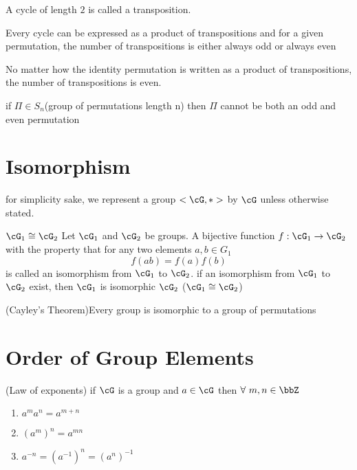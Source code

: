 \documentclass[11pt, oneside, dvipdfmx]{book}
\begin{document}
	\begin{description}
	\item A cycle of length $2$ is called a transposition.
	
	\item Every cycle can be expressed as a product of transpositions and for a given permutation, the number of transpositions is either always odd or always even
	\end{description}
	
	\begin{MyTheorem}
	No matter how the identity permutation is written as a product of transpositions, the number of transpositions is even.
	\end{MyTheorem}
	
	\begin{MyTheorem}
	if $\Pi \in S_n$(group of permutations length n)  then $\Pi$ cannot be both an odd and even permutation
	\end{MyTheorem}
	
	\section{Isomorphism}
	for simplicity sake, we represent a group $<\cG, *>$ by $\cG$ unless otherwise stated.
	\begin{MyDefinition}{$\cG_1\cong \cG_2$}
	Let $\cG_1$ and $\cG_2$ be groups. A bijective function $f: \cG_1 \rightarrow \cG_2$ with the property that for any two elements $a,b \in G_1$
	$$f(ab) =f(a)f(b)$$ is called an isomorphism from $\cG_1$ to $\cG_2$. if an isomorphism from $\cG_1$ to $\cG_2$ exist, then $\cG_1$ is isomorphic $\cG_2$ ($\cG_1 \cong \cG_2$)
	\end{MyDefinition}
	
	\begin{MyTheorem}
	(Cayley's Theorem)\newline Every group is isomorphic to a group of permutations
	\end{MyTheorem}
	
	\section{Order of Group Elements}
	
	\begin{MyTheorem}
	(Law of exponents)\newline 
	if $\cG$ is a group and $a\in \cG$ then $\forall ~m,n \in \bbZ$
	\begin{enumerate}
	\item $a^ma^n =a^{m+n}$
	\item $(a^m)^n = a^{mn}$
	\item $a^{-n} = (a^{-1})^n = (a^n)^{-1}$
	\end{enumerate}
	\end{MyTheorem}
	
\end{document}
